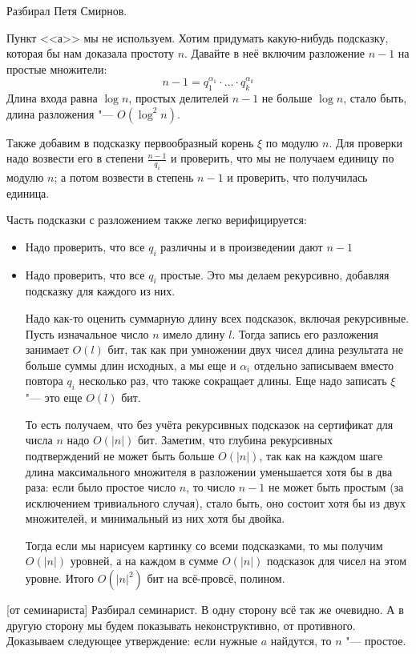 	Разбирал Петя Смирнов.

	Пункт <<а>> мы не используем.
	Хотим придумать какую-нибудь подсказку, которая бы нам доказала простоту $n$.
	Давайте в неё включим разложение $n-1$ на простые множители:
	\[ n-1 = q_1^{\alpha_1} \cdot \dots \cdot q_k^{\alpha_k} \]
	Длина входа равна $\log n$, простых делителей $n-1$ не больше $\log n$,
	стало быть, длина разложения "--- $O(\log^2 n)$.

	Также добавим в подсказку первообразный корень $\xi$ по модулю $n$.
	Для проверки надо возвести его в степени $\frac{n-1}{q_i}$ и проверить, что
	мы не получаем единицу по модулю $n$;
	а потом возвести в степень $n-1$ и проверить, что получилась единица.
	
	Часть подсказки с разложением также легко верифицируется:
	\begin{itemize}
		\item Надо проверить, что все $q_i$ различны и в произведении дают $n-1$
		\item
			Надо проверить, что все $q_i$ простые.
			Это мы делаем рекурсивно, добавляя подсказку для каждого из них.
			\begin{Rem}
				Надо как-то оценить суммарную длину всех подсказок, включая рекурсивные.
				Пусть изначальное число $n$ имело длину $l$.
				Тогда запись его разложения занимает $O(l)$ бит,
				так как при умножении двух чисел длина результата не больше суммы длин исходных,
				а мы еще и $\alpha_i$ отдельно записываем вместо повтора $q_i$ несколько раз,
				что также сокращает длины.
				Еще надо записать $\xi$ "--- это еще $O(l)$ бит.

				То есть получаем, что без учёта рекурсивных подсказок на сертификат для числа $n$
				надо $O(|n|)$ бит.
				Заметим, что глубина рекурсивных подтверждений не может быть больше $O(|n|)$,
				так как на каждом шаге длина максимального множителя в разложении уменьшается хотя бы
				в два раза: если было простое число $n$, то число $n-1$ не может быть простым (за исключением
				тривиального случая),
				стало быть, оно состоит хотя бы из двух множителей, и минимальный из них хотя бы двойка.

				Тогда если мы нарисуем картинку со всеми подсказками, то мы получим $O(|n|)$ уровней,
				а на каждом в сумме $O(|n|)$ подсказок для чисел на этом уровне.
				Итого $O(|n|^2)$ бит на всё-провсё, полином.
			\end{Rem}
	\end{itemize}

[от семинариста]
	Разбирал семинарист.
	В одну сторону всё так же очевидно.
	А в другую сторону мы будем показывать неконструктивно, от противного.
	Доказываем следующее утверждение: если нужные $a$ найдутся, то $n$ "--- простое.

